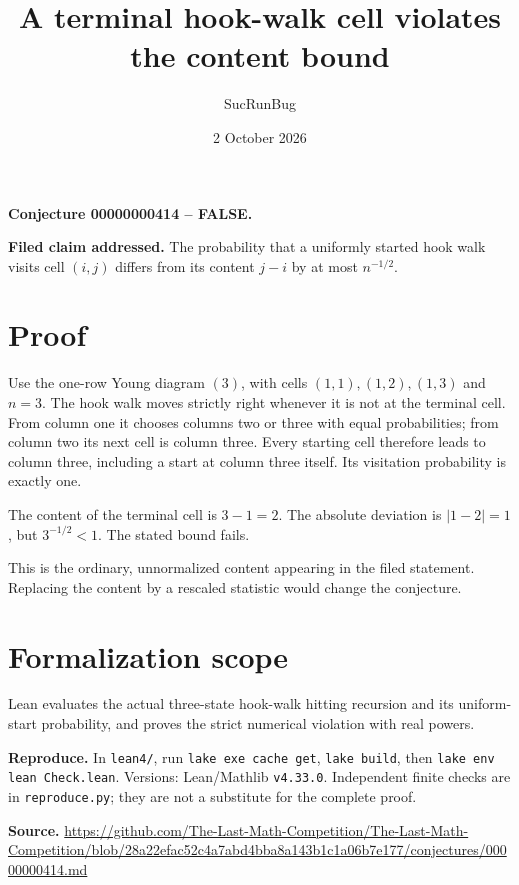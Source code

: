 \documentclass[11pt]{article}
\title{A terminal hook-walk cell violates the content bound}
\author{SucRunBug}
\date{2 October 2026}
\begin{document}
\maketitle
\textbf{Conjecture 00000000414 -- FALSE.}

\textbf{Filed claim addressed.} The probability that a uniformly started hook walk visits cell $(i,j)$ differs from its content $j-i$ by at most $n^{-1/2}$.

\section*{Proof}
Use the one-row Young diagram $(3)$, with cells $(1,1),(1,2),(1,3)$ and $n=3$. The hook walk moves strictly right whenever it is not at the terminal cell. From column one it chooses columns two or three with equal probabilities; from column two its next cell is column three. Every starting cell therefore leads to column three, including a start at column three itself. Its visitation probability is exactly one.

The content of the terminal cell is $3-1=2$. The absolute deviation is $|1-2|=1$, but $3^{-1/2}<1$. The stated bound fails.

This is the ordinary, unnormalized content appearing in the filed statement. Replacing the content by a rescaled statistic would change the conjecture.

\section*{Formalization scope}
Lean evaluates the actual three-state hook-walk hitting recursion and its uniform-start probability, and proves the strict numerical violation with real powers.

\textbf{Reproduce.} In \texttt{lean4/}, run \texttt{lake exe cache get},
\texttt{lake build}, then \texttt{lake env lean Check.lean}. Versions:
Lean/Mathlib \texttt{v4.33.0}. Independent finite checks are in
\texttt{reproduce.py}; they are not a substitute for the complete proof.

\textbf{Source.} \url{https://github.com/The-Last-Math-Competition/The-Last-Math-Competition/blob/28a22efac52c4a7abd4bba8a143b1c1a06b7e177/conjectures/00000000414.md}
\end{document}
